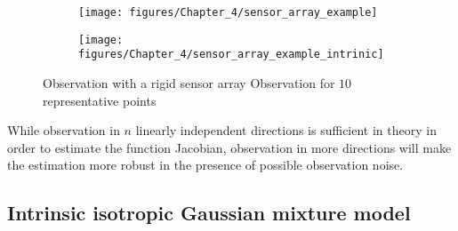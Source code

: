\begin{figure}[h]
	\begin{subfigure}[b]{0.48\columnwidth}%
			\texttt{[image: figures/Chapter\_4/sensor\_array\_example]}
	\end{subfigure}\hfill
	\begin{subfigure}[b]{0.48\columnwidth}%
			\texttt{[image: figures/Chapter\_4/sensor\_array\_example\_intrinic]}
	\end{subfigure}
	\caption{Observation with a rigid sensor array Observation for $10$ representative points \label{fig:Observation-with-a}}
\end{figure}

While observation in $n$ linearly independent directions is sufficient in theory in order to estimate the function Jacobian, observation in more directions will make the estimation more robust in the presence of possible observation noise.

\subsection{Intrinsic isotropic Gaussian mixture model \label{ssec:Intrinsic-isotropic-GMM}}


